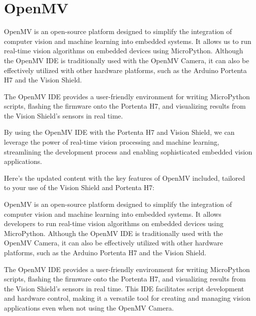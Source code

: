\section{OpenMV}
OpenMV is an open-source platform designed to simplify the integration of computer vision and machine learning into embedded systems. It allows us to run real-time vision algorithms on embedded devices using MicroPython. Although the OpenMV IDE is traditionally used with the OpenMV Camera, it can also be effectively utilized with other hardware platforms, such as the Arduino Portenta H7 and the Vision Shield.

The OpenMV IDE provides a user-friendly environment for writing MicroPython scripts, flashing the firmware onto the Portenta H7, and visualizing results from the Vision Shield's sensors in real time.

By using the OpenMV IDE with the Portenta H7 and Vision Shield, we can leverage the power of real-time vision processing and machine learning, streamlining the development process and enabling sophisticated embedded vision applications. \cite{openmv_docs:2024}


Here's the updated content with the key features of OpenMV included, tailored to your use of the Vision Shield and Portenta H7:

OpenMV is an open-source platform designed to simplify the integration of computer vision and machine learning into embedded systems. It allows developers to run real-time vision algorithms on embedded devices using MicroPython. Although the OpenMV IDE is traditionally used with the OpenMV Camera, it can also be effectively utilized with other hardware platforms, such as the Arduino Portenta H7 and the Vision Shield.

The OpenMV IDE provides a user-friendly environment for writing MicroPython scripts, flashing the firmware onto the Portenta H7, and visualizing results from the Vision Shield's sensors in real time. This IDE facilitates script development and hardware control, making it a versatile tool for creating and managing vision applications even when not using the OpenMV Camera. \cite{openmv_docs:2024}

